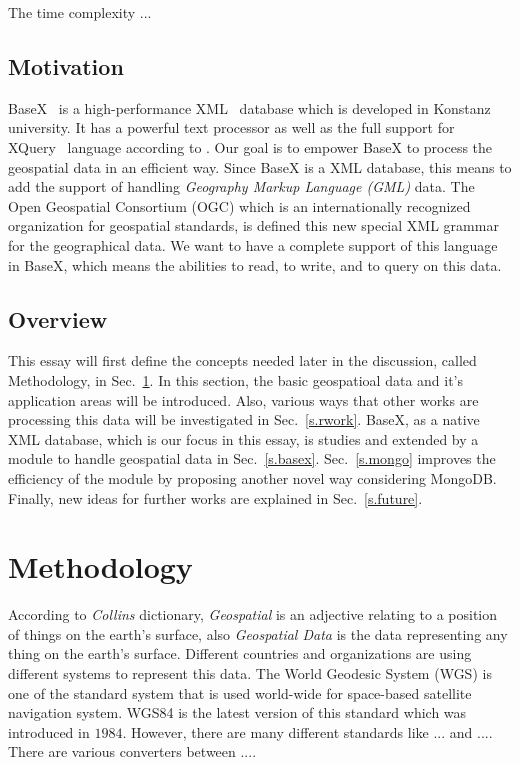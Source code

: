 \documentclass[a4paper,12pt]{article}
\begin{document}
The time complexity ...

\subsection{Motivation}
BaseX~\cite{www/basex} is a high-performance XML~\cite{www/xml}
 database which is developed in Konstanz university.
It has a powerful text processor as well as the full support 
for XQuery~\cite{www/xquery,www/xqueryfun} language according to \cite{conf/xsym/GrunGHS09}.
Our goal is to empower BaseX to process the geospatial data in an efficient way.
Since BaseX is a XML database, this means to add the support of handling 
\emph{Geography Markup Language (GML)} data. The Open Geospatial Consortium (OGC)
which is an internationally recognized organization for geospatial standards,
is defined this new special XML grammar for the geographical data.
We want to have a complete support of this language in BaseX,
which means the abilities to read, to write, and to query on this data.


\subsection{Overview}
This essay will first define the concepts needed later in the discussion, called
Methodology, in Sec.~\ref{s.method}. In this section, the basic geospatioal data
and it's application areas will be introduced. Also, various ways that other works
are processing this data will be investigated in Sec.~\ref{s.rwork}. BaseX,
as a native XML database, which is our focus in this essay, is studies and extended
by a module to handle geospatial data in Sec.~\ref{s.basex}. 
Sec.~\ref{s.mongo} improves the efficiency of the module
by proposing another novel way considering MongoDB.
Finally, new ideas for further works are explained in
Sec.~\ref{s.future}.


\newpage
\section{Methodology}
\label{s.method}
According to \emph{Collins} dictionary, \emph{Geospatial} is an adjective relating to a position of things on the
earth's surface, also \emph{Geospatial Data} is the data representing any thing on the earth's surface. Different 
countries and organizations are using different systems to represent this data. 
The World Geodesic System (WGS) is one of the standard system that is used world-wide 
for space-based satellite navigation system. WGS84 is the latest version of this standard which
was introduced in $1984$. However, there are many different standards like ... and .... 
There are various converters between ....
\end{document}
